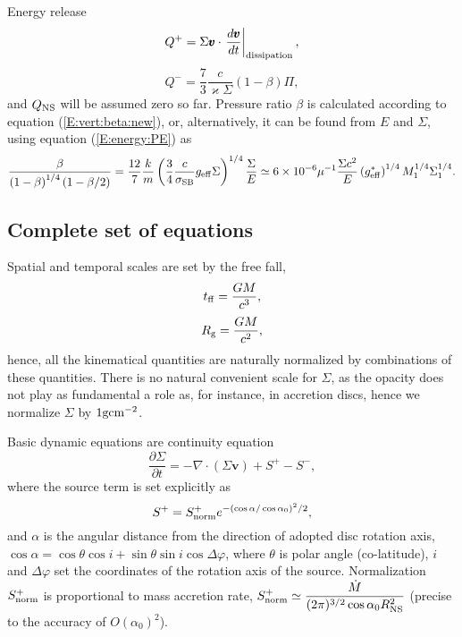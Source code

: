 \documentclass[usenatbib,onecolumn]{mnras}
\renewcommand{\vector}[1]{\ensuremath{\pmb{#1}}}
\newcommand{\pardir}[2]{\ensuremath{\frac{\partial #2}{\partial #1} }}
\begin{document}
Energy release
\begin{equation}\label{E:energy:qplus}
\displaystyle Q^+ = \Sigma \vector{v} \cdot \left.\frac{d\vector{v}}{dt}\right|_{\rm dissipation},
\end{equation}
\begin{equation}\label{E:energy:qminus}
\displaystyle Q^- = \frac{7}{3} \frac{c}{\varkappa \Sigma}(1-\beta) \Pi,
\end{equation}
and $Q_{\rm NS}$ will be assumed zero so far. Pressure ratio $\beta$ is
calculated according to equation (\ref{E:vert:beta:new}), or, alternatively,
it can be found from $E$ and $\Sigma$, using equation (\ref{E:energy:PE}) as
\begin{equation}\label{E:energy:beta}
\displaystyle \frac{\beta}{\left(1-\beta\right)^{1/4}\left(1-\beta/2\right)} = \frac{12}{7} \frac{k}{m}
\left(\frac{3}{4}\frac{c}{\sigma_{\rm SB}} g_{\rm eff} \Sigma \right)^{1/4}
\frac{\Sigma}{E} \simeq 6\times 10^{-6} \mu^{-1} \frac{\Sigma c^2}{E}
\left(g_{\rm eff}^*\right)^{1/4} M_1^{1/4} \Sigma_1^{1/4}.
\end{equation}


\subsection{Complete set of equations}

Spatial and temporal scales are set by the free fall,
\begin{equation}\label{E:set:timescale}
  t_{\rm ff} = \frac{GM}{c^3},
\end{equation}
\begin{equation}\label{E:set:radius}
  R_{\rm g} = \frac{GM}{c^2},
\end{equation}
hence, all the kinematical quantities are naturally normalized by combinations
of these quantities. There is no natural convenient scale for $\Sigma$, as the
opacity does not play as fundamental a role as, for instance, in accretion discs, hence we normalize $\Sigma$ by
$1{\rm g cm^{-2}}$. 

Basic dynamic equations are continuity equation
\begin{equation}\label{E:set:sigma}
\pardir{t}{\Sigma} = - \nabla \cdot (\Sigma \vector{v}) + S^+ - S^-,
\end{equation}
where the source term is set explicitly as
\begin{equation}\label{E:set:source}
S^+ = S^+_{\rm norm}e^{-(\cos\alpha/\cos\alpha_0)^2/2},
\end{equation}
and $\alpha$ is the angular distance from the direction of adopted disc
rotation axis, $\cos \alpha = \cos \theta \cos i+\sin \theta \sin i \cos
\Delta \varphi$, where $\theta$ is polar angle (co-latitude), $i$ and $\Delta
\varphi$ set the coordinates of the rotation axis of the source. Normalization
$S^+_{\rm norm}$ is proportional to mass accretion rate, $\displaystyle S^+_{\rm norm} \simeq
\frac{\dot{M}}{(2\pi)^{3/2} \cos\alpha_0 R_{\rm NS}^2}$ (precise to the
accuracy of $O(\alpha_0)^2$).
\end{document}
